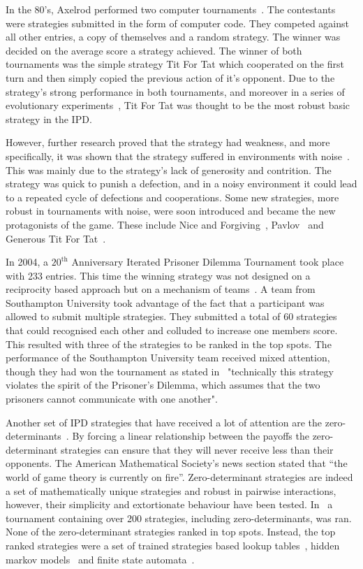 \documentclass{article}
\begin{document}
In the 80's, Axelrod performed two computer tournaments~\cite{Axelrod1980a,
Axelrod1980b}. The contestants were strategies submitted in the form of computer
code. They competed against all other entries, a copy of themselves and a random
strategy. The winner was decided on the average score a strategy achieved. The
winner of both tournaments was the simple strategy Tit For Tat which cooperated
on the first turn and then simply copied the previous action of it's opponent.
Due to the strategy's strong performance in both tournaments, and moreover in a
series of evolutionary experiments~\cite{Axelrod1981}, Tit For Tat was thought
to be the most robust basic strategy in the IPD.

However, further research proved that the strategy had weakness, and more
specifically, it was shown that the strategy suffered in environments with
noise~\cite{Bendor1991, Donninger1986, Molander1985, Hammerstein1984}. This was
mainly due to the strategy's lack of generosity and contrition. The strategy was
quick to punish a defection, and in a noisy environment it could lead to a
repeated cycle of defections and cooperations. Some new strategies, more
robust in tournaments with noise, were soon introduced and became the new
protagonists of the game. These include Nice and Forgiving~\cite{Bendor1991},
Pavlov~\cite{Nowak1993} and Generous Tit For Tat~\cite{Nowak1992}.

In 2004, a $20^{\text{th}}$ Anniversary Iterated Prisoner Dilemma Tournament
took place with 233 entries. This time the winning strategy was not designed on
a reciprocity based approach but on a mechanism of
teams~\cite{J.P.Delahaye1993Lp, J.P.Delahaye1995LIeP, A.Rogers2007Ctpw}. A team
from Southampton University took advantage of the fact that a participant was
allowed to submit multiple strategies. They submitted a total of 60 strategies
that could recognised each other and colluded to increase one members score.
This resulted with three of the strategies to be ranked in the top spots. The
performance of the Southampton University team received mixed attention, though
they had won the tournament as stated in~\cite{us_blog} "technically this
strategy violates the spirit of the Prisoner's Dilemma, which assumes that the
two prisoners cannot communicate with one another".

Another set of IPD strategies that have received a lot of attention
are the zero-determinants~\cite{Press2012}. By
forcing a linear relationship between the payoffs the zero-determinant
strategies can ensure that they will never receive less than their opponents.
The
American Mathematical Society's news section stated that ``the world of game
theory is currently on fire''.
Zero-determinant strategies are indeed a set of mathematically unique strategies
and robust in pairwise interactions, however, their simplicity and extortionate
behaviour have been tested. In~\cite{Harper2017} a tournament containing over
200 strategies, including zero-determinants, was ran. None of the zero-determinant
strategies ranked in top spots. Instead, the top ranked strategies were a set of
trained strategies based lookup tables~\cite{Axelrod1987}, hidden markov
models~\cite{Harper2017} and finite state automata~\cite{Miller1996}.
\end{document}
